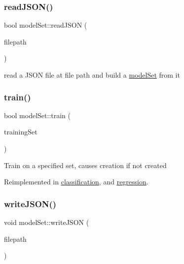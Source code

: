 \subsubsection{\texorpdfstring{read\+J\+S\+O\+N()}{readJSON()}}
{\footnotesize\ttfamily bool model\+Set\+::read\+J\+S\+ON (\begin{DoxyParamCaption}\item[{const std\+::string \&}]{filepath }\end{DoxyParamCaption})}

read a J\+S\+ON file at file path and build a \hyperlink{classmodel_set}{model\+Set} from it \mbox{\label{classmodel_set_a7620f95e8e29d547e7c688da51b33d9c}} 
\subsubsection{\texorpdfstring{train()}{train()}}
{\footnotesize\ttfamily bool model\+Set\+::train (\begin{DoxyParamCaption}\item[{const std\+::vector$<$ \hyperlink{structtraining_example}{training\+Example} $>$ \&}]{training\+Set }\end{DoxyParamCaption})\hspace{0.3cm}{\ttfamily [virtual]}}

Train on a specified set, causes creation if not created 

Reimplemented in \hyperlink{classclassification_ac7f8a3ad1a0f4f466cd6f5ed041615d9}{classification}, and \hyperlink{classregression_afb1956067fda0d20d2ed755086c9f592}{regression}.

\mbox{\label{classmodel_set_a8e2b783240dded1be8fad921b10707bf}} 
\subsubsection{\texorpdfstring{write\+J\+S\+O\+N()}{writeJSON()}}
{\footnotesize\ttfamily void model\+Set\+::write\+J\+S\+ON (\begin{DoxyParamCaption}\item[{const std\+::string \&}]{filepath }\end{DoxyParamCaption})}


